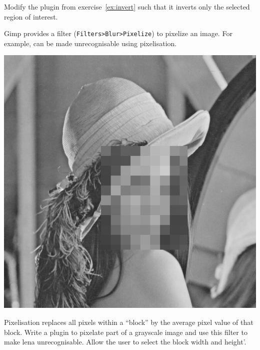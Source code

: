 \documentclass{book}
\begin{document}
\begin{exercise}
Modify the plugin from exercise~\ref{ex:invert} such that it inverts only the selected region of interest.
\end{exercise}

\begin{exercise}
Gimp provides a filter  (\texttt{Filters>Blur>Pixelize}) to pixelize an image. For example,  can be made unrecognisable using pixelisation. 
\begin{center}
  \includegraphics[scale=0.2]{lena-incognito.png}
\end{center}
Pixelisation replaces all pixels within a ``block'' by the average pixel value of that block. Write a plugin to pixelate part of a grayscale image and use this filter to make lena unrecognisable. Allow the user to select the block width and height'. 
\end{exercise}

\end{document}
